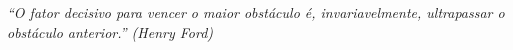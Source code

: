 %
%

\begin{epigrafe}

\textit{``O fator decisivo para vencer o maior obstáculo é, invariavelmente, ultrapassar o obstáculo anterior.'' (Henry Ford)}

\end{epigrafe}
